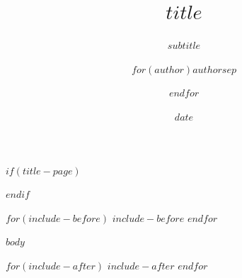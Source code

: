\documentclass[
  UTF8,
  $if(fontsize)$$fontsize$$else$11pt$endif$,
  aspectratio=$if(aspectratio)$$aspectratio$$else$169$endif$
]{ctexbeamer}
\title{$title$}
\subtitle{$subtitle$}
\author{$for(author)$$author$$sep$ \and $endfor$}
\institute{$institute$}
\date{$date$}
\date{}
\begin{document}
$if(title-page)$
\begin{frame}
  \titlepage
\end{frame}
$endif$

$for(include-before)$
$include-before$
$endfor$

$body$

$for(include-after)$
$include-after$
$endfor$
\end{document}
